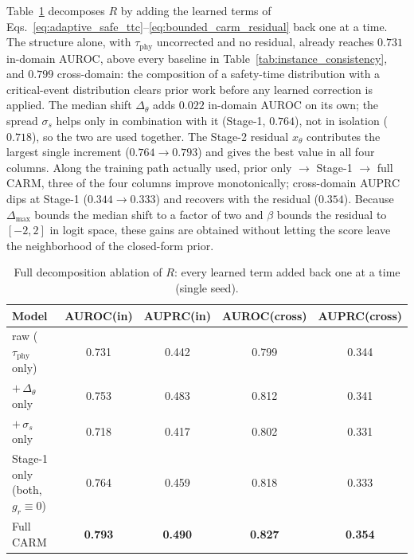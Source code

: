 \documentclass[letterpaper, 10 pt, conference]{ieeeconf}  %
\begin{document}
Table~\ref{tab:residual_ablation} decomposes $R$ by adding the learned
terms of Eqs.~\eqref{eq:adaptive_safe_ttc}--\eqref{eq:bounded_carm_residual}
back one at a time. The structure alone, with $\tau_{\mathrm{phy}}$
uncorrected and no residual, already reaches $0.731$ in-domain AUROC,
above every baseline in Table~\ref{tab:instance_consistency}, and $0.799$
cross-domain: the composition of a safety-time distribution with a
critical-event distribution clears prior work before any learned
correction is applied. The median shift $\Delta_\theta$ adds $0.022$
in-domain AUROC on its own; the spread $\sigma_s$ helps only in
combination with it (Stage-1, $0.764$), not in isolation ($0.718$), so
the two are used together. The Stage-2 residual $x_\theta$ contributes
the largest single increment ($0.764\to0.793$) and gives the best value
in all four columns. Along the training path actually used, prior only
$\to$ Stage-1 $\to$ full CARM, three of the four columns improve
monotonically; cross-domain AUPRC dips at Stage-1 ($0.344\to0.333$) and
recovers with the residual ($0.354$). Because $\Delta_{\max}$ bounds the
median shift to a factor of two and $\beta$ bounds the residual to
$[-2,2]$ in logit space, these gains are obtained without letting the
score leave the neighborhood of the closed-form prior.

\begin{table}[t]
\scriptsize
\renewcommand{\arraystretch}{0.92}
\setlength{\tabcolsep}{3.5pt}
\centering
\caption{Full decomposition ablation of $R$: every learned term added back
one at a time (single seed).}
\label{tab:residual_ablation}
\begin{tabular}{lcccc}
\toprule
Model & AUROC(in) & AUPRC(in) & AUROC(cross) & AUPRC(cross) \\
\midrule
raw ($\tau_{\mathrm{phy}}$ only) & 0.731 & 0.442 & 0.799 & 0.344 \\
$+\,\Delta_\theta$ only & 0.753 & 0.483 & 0.812 & 0.341 \\
$+\,\sigma_s$ only & 0.718 & 0.417 & 0.802 & 0.331 \\
Stage-1 only (both, $g_r\equiv0$) & 0.764 & 0.459 & 0.818 & 0.333 \\
Full CARM & \textbf{0.793} & \textbf{0.490} & \textbf{0.827} & \textbf{0.354} \\
\bottomrule
\end{tabular}
\end{table}
\end{document}
